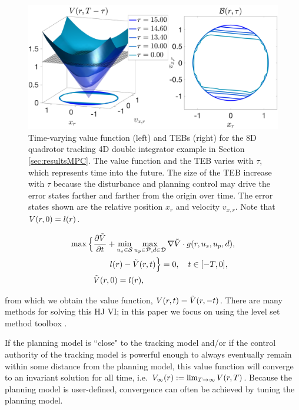 \begin{figure}
	\centering
	\includegraphics[width=\columnwidth]{fig/tv_valfunc}
	\caption{Time-varying value function (left) and TEBs (right) for the 8D quadrotor tracking 4D double integrator example in Section \ref{sec:resultsMPC}. The value function and the TEB varies with $\tau$, which represents time into the future. 
  The size of the TEB increase with $\tau$ because the disturbance and planning control may drive the error states farther and farther from the origin over time. 
  The error states shown are the relative position $x_r$ and velocity $v_{x,r}$.  Note that $V(r,0) = l(r)$.}
	\label{fig:vf_TEB:8D4D}
\end{figure} 

\begin{align}
\max \Big\{&\frac{\partial \tilde\valfunc}{\partial \tvar} + \min_{\tctrl\in\tset} \max_{\pctrl\in\pset, \dstb\in\dset} \nabla \tilde\valfunc \cdot \rdyn(\rstate, \tctrl, \pctrl, \dstb), \nonumber \\
&\qquad\errfunc(\rstate) - \tilde\valfunc(\rstate, \tvar)\Big\} = 0, \quad \tvar \in [-T, 0], \label{eq:HJVI} \\
&\tilde\valfunc(\rstate, 0) = \errfunc(\rstate), \nonumber
\end{align}

\noindent from which we obtain the value function, $V(r, t) = \tilde{V}(r, -t)$. There are many methods for solving this HJ VI; in this paper we focus on using the level set method toolbox \cite{Mitchell07c}.

If the planning model is ``close" to the tracking model and/or if the control authority of the tracking model is powerful enough to always eventually remain within some distance from the planning model, this value function will converge to an invariant solution for all time, i.e. $V_\infty(r) := \lim_{T\rightarrow\infty} V(r, T)$. 
Because the planning model is user-defined, convergence can often be achieved by tuning the planning model.

